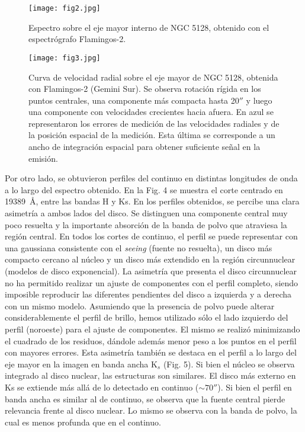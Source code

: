 \documentclass[baaa]{baaa}
\begin{document}
\begin{figure}[!t]
\centering
\texttt{[image: fig2.jpg]}
\caption{Espectro sobre el eje mayor interno de NGC 5128, obtenido con el espectrógrafo Flamingos-2.
}
\label{Figura2}
\end{figure}

\begin{figure}[!t]
\centering
\texttt{[image: fig3.jpg]}
\caption{Curva de velocidad radial sobre el eje mayor de NGC 5128, obtenida con Flamingos-2 (Gemini Sur). Se observa rotación rígida en los puntos centrales, una componente más compacta hasta 20$''$ y luego una componente con velocidades crecientes hacia afuera. En azul se representaron los errores de medición de las velocidades radiales y de la posición espacial de la medición. Esta última se corresponde a un ancho de integración espacial para obtener suficiente señal en la emisión.
}
\label{Figura3}
\end{figure}

Por otro lado, se obtuvieron perfiles del continuo en distintas longitudes de onda a lo largo del espectro obtenido. En la Fig. 4 se muestra el corte centrado en 19389\textup{~\AA}, entre las bandas H y Ks. En los perfiles obtenidos, se percibe una clara asimetría a ambos lados del disco. Se distinguen una componente central muy poco resuelta y la importante absorción de la banda de polvo que atraviesa la región central. En todos los cortes de continuo, el perfil se puede representar con una gaussiana consistente con el \textit{seeing} (fuente no resuelta), un disco más compacto cercano al núcleo y un disco más extendido en la región circunnuclear (modelos de disco exponencial). La asimetría que presenta el disco circunnuclear no ha permitido realizar un ajuste de componentes con el perfil completo, siendo imposible reproducir las diferentes pendientes del disco a izquierda y a derecha con un mismo modelo. Asumiendo que la presencia de polvo puede alterar considerablemente el perfil de brillo, hemos utilizado sólo el lado izquierdo del perfil (noroeste) para el ajuste de componentes. El mismo se realizó minimizando el cuadrado de los residuos, dándole además menor peso a los puntos en el perfil con mayores errores.
Esta asimetría también se destaca en el perfil a lo largo del eje mayor en la imagen en banda ancha K$_{s}$ (Fig. 5). Si bien el núcleo se observa integrado al disco nuclear, las estructuras son similares. El disco más externo en Ks se extiende más allá de lo detectado en continuo ($\sim70''$).
Si bien el perfil en banda ancha es similar al de continuo, se observa que la fuente central pierde relevancia frente al disco nuclear. Lo mismo se observa con la banda de polvo, la cual es menos profunda que en el continuo.
\end{document}
